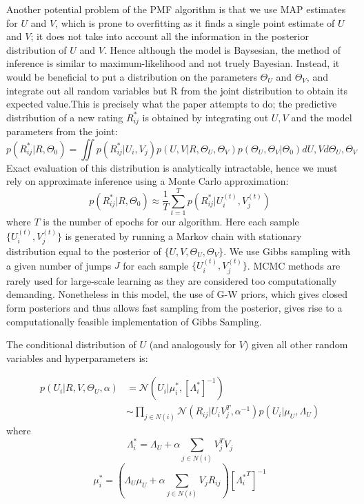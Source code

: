 \documentclass{article}
\theoremstyle{plain}
\begin{document}
Another potential problem of the PMF algorithm is that we use MAP estimates for $U$ and $V$, which is prone to overfitting as it finds a single point estimate of $U$ and $V$; it does not take into account all the information in the posterior distribution of $U$  and $V$. Hence although the model is Baysesian, the method of inference is similar to maximum-likelihood and not truely Bayesian. Instead, it would be beneficial to put a distribution on the parameters $\Theta_U$ and $\Theta_V$, and integrate out all random variables but R from the joint distribution to obtain its expected value.This is precisely what the paper attempts to do; the predictive distribution of a new rating $R_{ij}^*$ is obtained by integrating out $U,V$ and the model parameters from the joint:
\begin{equation}
p(R_{ij}^*|R,\Theta_0)=\iint p(R_{ij}^*|U_i,V_j)p(U,V|R,\Theta_U,\Theta_V)p(\Theta_U,\Theta_V|\Theta_0)d{U,V}d{\Theta_U,\Theta_V}
\end{equation}
Exact evaluation of this distribution is analytically intractable, hence we must rely on approximate inference using a Monte Carlo approximation:
\begin{equation}
p(R_{ij}^*|R,\Theta_0) \approx \frac{1}{T}\sum_{t=1}^T p(R_{ij}^*|U_i^{(t)},V_j^{(t)})
\end{equation}
where $T$ is the number of epochs for our algorithm. Here each sample $\{U_i^{(t)},V_j^{(t)}\}$ is generated by running a Markov chain with stationary distribution equal to the posterior of $\{U,V,\Theta_U,\Theta_V\}$. We use Gibbs sampling with a given number of jumps $J$ for each sample $\{U_i^{(t)},V_j^{(t)}\}$. MCMC methods are rarely used for large-scale learning as they are considered too computationally demanding. Nonetheless in this model, the use of G-W priors, which gives closed form posteriors and thus allows fast sampling from the posterior, gives rise to a computationally feasible implementation of Gibbs Sampling.

The conditional distribution of $U$ (and analogously for $V$) given all other random variables and hyperparameters is:

\begin{equation}
\begin{split}
p(U_i|R,V,\Theta_U,\alpha)
& = \mathcal{N}(U_i|\mu_i^*,[\Lambda_i^*]^{-1}) \\
& \sim \prod_{j \in N(i)} \mathcal{N}(R_{ij}|U_iV_j^T,\alpha^{-1})p(U_i|\mu_U,\Lambda_U)
\end{split}
\end{equation}
where
\begin{equation}
\Lambda_i^*=\Lambda_U+\alpha\sum_{j\in N(i)} V_j^TV_j
\end{equation}
\begin{equation}
\mu_i^*=(\Lambda_U\mu_U + \alpha\sum_{j\in N(i)} V_jR_{ij} )[{\Lambda_i^*}^T]^{-1}
\end{equation}
\end{document}

